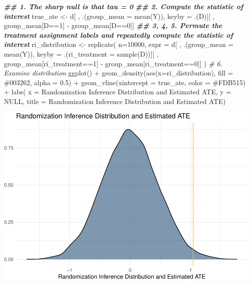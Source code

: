 \documentclass[
]{article}
\newenvironment{Shaded}{\begin{snugshade}}{\end{snugshade}}
\newcommand{\AttributeTok}[1]{\textcolor[rgb]{0.77,0.63,0.00}{#1}}
\newcommand{\CommentTok}[1]{\textcolor[rgb]{0.56,0.35,0.01}{\textit{#1}}}
\newcommand{\ConstantTok}[1]{\textcolor[rgb]{0.00,0.00,0.00}{#1}}
\newcommand{\DecValTok}[1]{\textcolor[rgb]{0.00,0.00,0.81}{#1}}
\newcommand{\DocumentationTok}[1]{\textcolor[rgb]{0.56,0.35,0.01}{\textbf{\textit{#1}}}}
\newcommand{\FloatTok}[1]{\textcolor[rgb]{0.00,0.00,0.81}{#1}}
\newcommand{\FunctionTok}[1]{\textcolor[rgb]{0.00,0.00,0.00}{#1}}
\newcommand{\NormalTok}[1]{#1}
\newcommand{\OtherTok}[1]{\textcolor[rgb]{0.56,0.35,0.01}{#1}}
\newcommand{\SpecialCharTok}[1]{\textcolor[rgb]{0.00,0.00,0.00}{#1}}
\newcommand{\StringTok}[1]{\textcolor[rgb]{0.31,0.60,0.02}{#1}}
\begin{document}
\begin{Shaded}
\begin{Highlighting}[]
\DocumentationTok{\#\# 1. The sharp null is that tau = 0}
\DocumentationTok{\#\# 2. Compute the statistic of interest}
\NormalTok{true\_ate }\OtherTok{\textless{}{-}}\NormalTok{ d[ , .(}\AttributeTok{group\_mean =} \FunctionTok{mean}\NormalTok{(Y)), keyby }\OtherTok{=}\NormalTok{ .(D)][ , group\_mean[D}\SpecialCharTok{==}\DecValTok{1}\NormalTok{] }\SpecialCharTok{{-}}\NormalTok{ group\_mean[D}\SpecialCharTok{==}\DecValTok{0}\NormalTok{]]}
\DocumentationTok{\#\# 3, 4, 5. Permute the treatment assignment labels and repeatedly compute the statistic of interest }
\NormalTok{ri\_distribution }\OtherTok{\textless{}{-}} \FunctionTok{replicate}\NormalTok{(}
  \AttributeTok{n=}\DecValTok{10000}\NormalTok{, }
  \AttributeTok{expr =}\NormalTok{ d[ , .(}\AttributeTok{group\_mean =} \FunctionTok{mean}\NormalTok{(Y)), }\AttributeTok{keyby =}\NormalTok{ .(}\AttributeTok{ri\_treatment =} \FunctionTok{sample}\NormalTok{(D))][ , }
\NormalTok{            group\_mean[ri\_treatment}\SpecialCharTok{==}\DecValTok{1}\NormalTok{] }\SpecialCharTok{{-}}\NormalTok{ group\_mean[ri\_treatment}\SpecialCharTok{==}\DecValTok{0}\NormalTok{]]}
\NormalTok{  )}
\CommentTok{\# 6. Examine distribution}
\FunctionTok{ggplot}\NormalTok{() }\SpecialCharTok{+} 
  \FunctionTok{geom\_density}\NormalTok{(}\FunctionTok{aes}\NormalTok{(}\AttributeTok{x=}\NormalTok{ri\_distribution), }\AttributeTok{fill =} \StringTok{\textquotesingle{}\#003262\textquotesingle{}}\NormalTok{, }\AttributeTok{alpha =} \FloatTok{0.5}\NormalTok{) }\SpecialCharTok{+} 
  \FunctionTok{geom\_vline}\NormalTok{(}\AttributeTok{xintercept =}\NormalTok{ true\_ate, }\AttributeTok{color =} \StringTok{\textquotesingle{}\#FDB515\textquotesingle{}}\NormalTok{) }\SpecialCharTok{+} 
  \FunctionTok{labs}\NormalTok{(}
    \AttributeTok{x     =} \StringTok{\textquotesingle{}Randomization Inference Distribution and Estimated ATE\textquotesingle{}}\NormalTok{, }
    \AttributeTok{y     =}  \ConstantTok{NULL}\NormalTok{, }
    \AttributeTok{title =} \StringTok{\textquotesingle{}Randomization Inference Distribution and Estimated ATE\textquotesingle{}}\NormalTok{)}
\end{Highlighting}
\end{Shaded}

\includegraphics{241-live-session_files/figure-latex/randomization inference loop-1.pdf}
\end{document}
